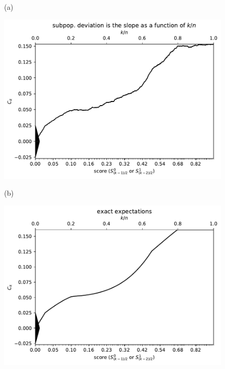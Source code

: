 \documentclass{article}
\newlength{\vertsep}
\newlength{\imsize}
\begin{document}
\begin{figure}
\begin{centering}

(a)
\parbox{\imsize}{\includegraphics[width=\imsize]
{../codes/unweighted/10000_7000_10_1/cumulative.pdf}}
\quad\quad
(b)
\parbox{\imsize}{\includegraphics[width=\imsize]
{../codes/unweighted/10000_7000_10_1/cumulative_exact.pdf}}

\vspace{\vertsep}


\end{centering}
\end{figure}
\end{document}
